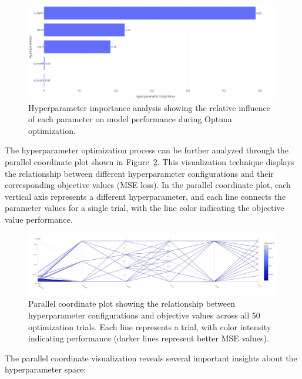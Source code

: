 \begin{figure}[htbp]
    \centering
    \includegraphics[width=1\textwidth]{imgs/Hyperparameter_importance.png}
    \caption{Hyperparameter importance analysis showing the relative influence of each parameter on model performance during Optuna optimization.}
    \label{fig:hyperparameter_importance}
\end{figure}

The hyperparameter optimization process can be further analyzed through the parallel coordinate plot shown in Figure~\ref{fig:parallel_coordinates}. This visualization technique displays the relationship between different hyperparameter configurations and their corresponding objective values (MSE loss). In the parallel coordinate plot, each vertical axis represents a different hyperparameter, and each line connects the parameter values for a single trial, with the line color indicating the objective value performance.

\begin{figure}[htbp]
    \centering
    \includegraphics[width=1.0\textwidth]{imgs/objective_parallel_coordinate.png}
    \caption{Parallel coordinate plot showing the relationship between hyperparameter configurations and objective values across all 50 optimization trials. Each line represents a trial, with color intensity indicating performance (darker lines represent better MSE values).}
    \label{fig:parallel_coordinates}
\end{figure}

The parallel coordinate visualization reveals several important insights about the hyperparameter space:


